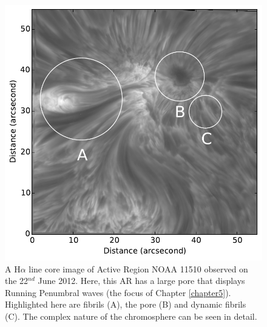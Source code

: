    \begin{figure}
    	\centering
    	\includegraphics[width=\textwidth]{Chromo.pdf}
    	\caption{
    		A H$\alpha$ line core image of Active Region NOAA 11510 observed on the 22$^{{nd}}$ June 2012.
    		Here, this AR has a large pore that displays Running Penumbral waves (the focus of Chapter \ref{chapter5}).
    		Highlighted here are fibrils (A), the pore (B) and dynamic fibrils (C).
    		The complex nature of the chromosphere can be seen in detail.
    	}
    	\label{fig:chromosphere}
    \end{figure}   
    	
